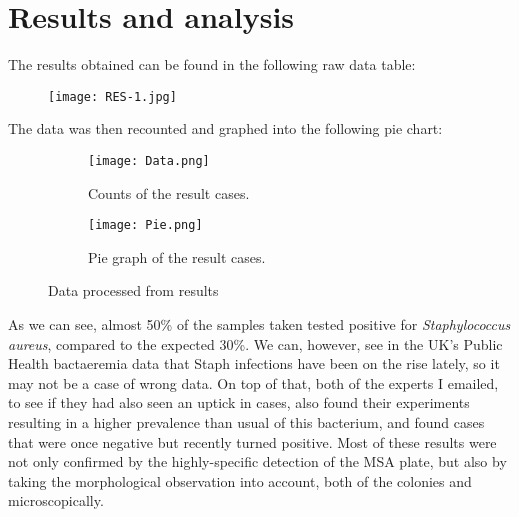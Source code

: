 \section{Results and analysis}
The results obtained can be found in the following raw data table:
\begin{center}\begin{figure}[H]\centering\texttt{[image: RES-1.jpg]}\end{figure}\end{center}
The data was then recounted and graphed into the following pie chart:
\begin{center}\begin{figure}[H]\centering\begin{subfigure}[b]{0.4\linewidth}\texttt{[image: Data.png]}\caption{Counts of the result cases.}\end{subfigure}\begin{subfigure}[b]{0.38\linewidth}\texttt{[image: Pie.png]}\caption{Pie graph of the result cases.}\end{subfigure}\caption{Data processed from results}\end{figure}\end{center}\vspace{-1.5em}
As we can see, almost 50\% of the samples taken tested positive for \emph{Staphylococcus aureus}, compared to the expected 30\%\cite{StaphylococcusAureusHealthcare2020}. We can, however, see in the UK's Public Health bactaeremia data that Staph infections have been on the rise lately, so it may not be a case of wrong data\cite{englandMSSABacteraemiaAnnual2021}. On top of that, both of the experts I emailed, to see if they had also seen an uptick in cases, also found their experiments resulting in a higher prevalence than usual of this bacterium, and found cases that were once negative but recently turned positive. Most of these results were not only confirmed by the highly-specific detection of the MSA plate, but also by taking the morphological observation into account, both of the colonies and microscopically.
